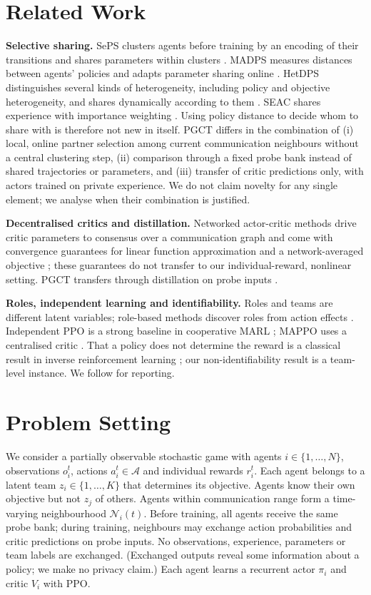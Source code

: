 \documentclass{article}
\theoremstyle{remark}
\newcommand{\ours}{PGCT}
\begin{document}
\section{Related Work}
\textbf{Selective sharing.} SePS clusters agents before training by an encoding of their transitions and shares parameters
within clusters \cite{christianos2021seps}. MADPS measures distances between agents' policies and adapts parameter
sharing online \cite{hu2024madps}. HetDPS distinguishes several kinds of heterogeneity, including policy and objective
heterogeneity, and shares dynamically according to them \cite{hu2026hetdps}. SEAC shares experience with importance
weighting \cite{christianos2020seac}. Using policy distance to decide whom to share with is therefore not new in itself.
\ours{} differs in the combination of (i) local, online partner selection among current communication neighbours without
a central clustering step, (ii) comparison through a fixed probe bank instead of shared trajectories or parameters, and
(iii) transfer of critic predictions only, with actors trained on private experience. We do not claim novelty for any
single element; we analyse when their combination is justified.

\textbf{Decentralised critics and distillation.} Networked actor-critic methods drive critic parameters to consensus over a
communication graph and come with convergence guarantees for linear function approximation and a network-averaged
objective \cite{zhang2018networked}; these guarantees do not transfer to our individual-reward, nonlinear setting.
\ours{} transfers through distillation on probe inputs \cite{rusu2016policy}.

\textbf{Roles, independent learning and identifiability.} Roles and teams are different latent variables; role-based
methods discover roles from action effects \cite{wang2021rode}. Independent PPO is a strong baseline in cooperative MARL
\cite{schulman2017ppo,dewitt2020ippo}; MAPPO uses a centralised critic \cite{yu2022mappo}. That a policy does not determine
the reward is a classical result in inverse reinforcement learning \cite{ng2000irl}; our non-identifiability result is a
team-level instance. We follow \cite{agarwal2021precipice} for reporting.

\section{Problem Setting}
\label{sec:setting}
We consider a partially observable stochastic game with agents $i\in\{1,\dots,N\}$, observations $o_i^t$, actions
$a_i^t\in\mathcal{A}$ and individual rewards $r_i^t$. Each agent belongs to a latent team $z_i\in\{1,\dots,K\}$ that
determines its objective. Agents know their own objective but not $z_j$ of others. Agents within communication range form
a time-varying neighbourhood $\mathcal{N}_i(t)$. Before training, all agents receive the same probe bank; during training,
neighbours may exchange action probabilities and critic predictions on probe inputs. No observations, experience,
parameters or team labels are exchanged. (Exchanged outputs reveal some information about a policy; we make no privacy
claim.) Each agent learns a recurrent actor $\pi_i$ and critic $V_i$ with PPO.
\end{document}
